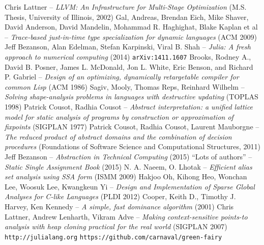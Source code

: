 \documentclass[11pt]{article}
\begin{document}
\newpage

\begin{thebibliography}{9}
 Chris Lattner -- \emph{LLVM: An Infrastructure for Multi-Stage Optimization} (M.S. Thesis, University of Illinois, 2002)
 Gal, Andreas, Brendan Eich, Mike Shaver, David Anderson, David Mandelin, Mohammad R. Haghighat, Blake Kaplan et al -- \emph{Trace-based just-in-time type specialization for dynamic languages} (ACM 2009)
 Jeff Bezanson, Alan Edelman, Stefan Karpinski, Viral B. Shah -- \emph{Julia: A fresh approach to numerical computing} (2014) \verb~arXiv:1411.1607~
 Brooks, Rodney A., David B. Posner, James L. McDonald, Jon L. White, Eric Benson, and Richard P. Gabriel -- \emph{Design of an optimizing, dynamically retargetable compiler for common Lisp} (ACM 1986)
 Sagiv, Mooly, Thomas Reps, Reinhard Wilhelm -- \emph{Solving shape-analysis problems in languages with destructive updating} (TOPLAS 1998)
 Patrick Cousot, Radhia Cousot -- \emph{Abstract interpretation: a unified lattice model for static analysis of programs by construction or approximation of fixpoints} (SIGPLAN 1977)
 Patrick Cousot, Radhia Cousot, Laurent Mauborgne -- \emph{The reduced product of abstract domains and the combination of decision procedures} (Foundations of Software Science and Computational Structures, 2011)
 Jeff Bezanson -- \emph{Abstraction in Technical Computing} (2015)
 ``Lots of authors'' -- \emph{Static Single Assignment Book} (2015)
 N. A. Naeem, O. Lhotak -- \emph{Efficient alias set analysis using SSA form} (ISMM 2009)
 Hakjoo Oh, Kihong Heo, Wonchan Lee, Woosuk Lee, Kwangkeun Yi -- \emph{Design and Implementation of Sparse Global Analyses for C-like Languages} (PLDI 2012)
 Cooper, Keith D., Timothy J. Harvey, Ken Kennedy -- \emph{A simple, fast dominance algorithm} (2001)
 Chris Lattner, Andrew Lenharth, Vikram Adve -- \emph{Making context-sensitive points-to analysis with heap cloning practical for the real world} (SIGPLAN 2007)
 \verb~http://julialang.org~
 \verb~https://github.com/carnaval/green-fairy~
\end{thebibliography}
\end{document}
